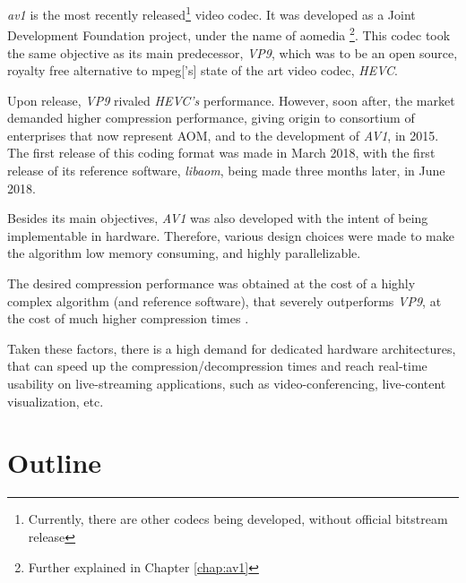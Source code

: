 \emph{\gls{av1}} is the most recently released\footnote{Currently, there are other codecs being developed, without official bitstream release} video codec. It was developed as a Joint Development Foundation \cite{JointDevelopmentFoundation} project, under the name of \gls{aomedia} \footnote{Further explained in Chapter \ref{chap:av1}}. This codec took the same objective as its main predecessor, \textit{VP9}, which was to be an open source, royalty free alternative to \gls{mpeg}['s] state of the art video codec, \textit{\gls{HEVC}}.

Upon release, \textit{VP9} rivaled \textit{HEVC's} performance. However, soon after, the market demanded higher compression performance, giving origin to consortium of  enterprises that now represent AOM, and to the development of \textit{AV1}, in 2015. The first release of this coding format was made in March 2018, with the first release of its reference software, \textit{\gls{libaom}}, being made three months later, in June 2018.

Besides its main objectives, \textit{AV1} was also developed with the intent of being implementable in hardware. Therefore, various design choices were made to make the algorithm low memory consuming, and highly parallelizable. 

The desired compression performance was obtained at the cost of a highly complex algorithm (and reference software), that severely outperforms \textit{VP9}, at the cost of much higher compression times \cite{groisPerformanceComparisonAV12018}
.

Taken these factors, there is a high demand for dedicated hardware architectures, that can speed up the compression/decompression times and reach real-time usability on live-streaming applications, such as video-conferencing, live-content visualization, etc.




\section{Outline}


\printbibliography[heading=subbibliography]
